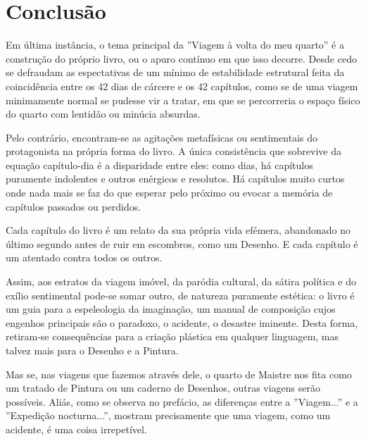\documentclass[12pt]{article}
\begin{document}
\section{Conclusão}

Em última instância, o tema principal da ''Viagem à volta do meu
quarto'' é a construção do próprio livro, ou o apuro contínuo em que
isso decorre. Desde cedo se defraudam as espectativas de um mínimo de
estabilidade estrutural feita da coincidência entre os 42 dias de
cárcere e os 42 capítulos, como se de uma viagem minimamente normal se
pudesse vir a tratar, em que se percorreria o espaço físico do quarto
com lentidão ou minúcia absurdas.

Pelo contrário, encontram-se as agitações metafísicas ou sentimentais
do protagonista na própria forma do livro. A única consistência que
sobrevive da equação capítulo-dia é a disparidade entre eles: como
dias, há capítulos puramente indolentes e outros enérgicos e
resolutos. Há capítulos muito curtos onde nada mais se faz do que
esperar pelo próximo ou evocar a memória de capítulos passados ou
perdidos.

Cada capítulo do livro é um relato da sua própria vida efémera,
abandonado no último segundo antes de ruir em escombros, como um
Desenho. E cada capítulo é um atentado contra todos os outros.

Assim, aos estratos da viagem imóvel, da paródia cultural, da sátira
política e do exílio sentimental pode-se somar outro, de natureza
puramente estética: o livro é um guia para a espeleologia da
imaginação, um manual de composição cujos engenhos principais são o
paradoxo, o acidente, o desastre iminente. Desta forma, retiram-se
consequências para a criação plástica em qualquer linguagem, mas
talvez mais para o Desenho e a Pintura.

Mas se, nas viagens que fazemos através dele, o quarto de Maistre nos
fita como um tratado de Pintura ou um caderno de Desenhos, outras
viagens serão possíveis. Aliás, como se observa no prefácio, as
diferenças entre a ''Viagem...'' e a ''Expedição nocturna...'',
mostram precisamente que uma viagem, como um acidente, é uma coisa
irrepetível.

\printbibliography[heading=bibliography,title={Bibliografia}]
\end{document}
